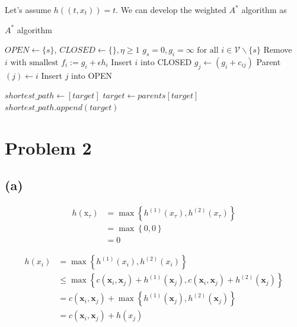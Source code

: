 \documentclass{article} %
\begin{document}
Let's assume $h((t, x_t)) = t$. We can develop the weighted $A^*$ algorithm as
\begin{algorithm}
    \caption{$A^*$ algorithm}\label{A}
    \begin{algorithmic}[1]
    
    \State $OPEN \gets \{s\}$, $CLOSED \gets \{\}, \eta \ge 1$ 
    \State $g_{s}=0, g_{i}=\infty \text { for all } i \in \mathcal{V} \backslash\{s\}$
        \State Remove $i \text { with smallest } f_{i} :=g_{i}+\epsilon h_{i}$
        \State Insert $i$ into CLOSED
                \State $g_{j} \leftarrow\left(g_{i}+c_{i j}\right)$
                \State Parent $(j) \leftarrow i$
                \State Insert $j$ into OPEN
            \EndIf
        \EndFor
    \EndWhile

    \State $shortest\_path \gets [target]$
        \State $target \gets parents[target]$
        \State $shortest\_path.append(target)$
    \EndWhile
    
    
    \EndProcedure
    \end{algorithmic}
\end{algorithm}


\section{Problem 2}

\subsection{(a)}

\begin{equation*}
    \begin{aligned}
        h\left(\mathrm{x}_{\tau}\right) &= \max \left\{h^{(1)}(x_{\tau}), h^{(2)}(x_{\tau}) \right\} \\
            &= \max \left\{0, 0\right\} \\
            &= 0
    \end{aligned}
\end{equation*}

\begin{equation*}
    \begin{aligned}
        h(x_i) &=\max \left\{h^{(1)}(x_i), h^{(2)}(x_i) \right\} \\
            &\le \max \left\{ c\left(\mathbf{x}_{i}, \mathbf{x}_{j}\right)+h^{(1)} \left(\mathbf{x}_{j}\right),  c\left(\mathbf{x}_{i}, \mathbf{x}_{j}\right)+h^{(2)} \left(\mathbf{x}_{j}\right) \right\} \\
            &= c\left(\mathbf{x}_{i}, \mathbf{x}_{j}\right) + \max \left\{ h^{(1)} \left(\mathbf{x}_{j}\right), h^{(2)} \left(\mathbf{x}_{j}\right) \right\} \\
            &= c\left(\mathbf{x}_{i}, \mathbf{x}_{j}\right) + h(x_j)
    \end{aligned}
\end{equation*}
\end{document}
